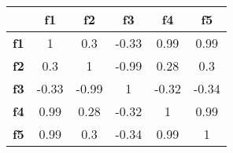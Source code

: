 \begin{tabular}{|l|c|c|c|c|c|}
\hline
&\textbf{f1}&\textbf{f2}&\textbf{f3}&\textbf{f4}&\textbf{f5}\\\hline
\textbf{f1}&1&0.3&-0.33&0.99&0.99\\\hline
\textbf{f2}&0.3&1&-0.99&0.28&0.3\\\hline
\textbf{f3}&-0.33&-0.99&1&-0.32&-0.34\\\hline
\textbf{f4}&0.99&0.28&-0.32&1&0.99\\\hline
\textbf{f5}&0.99&0.3&-0.34&0.99&1\\\hline
\end{tabular}
